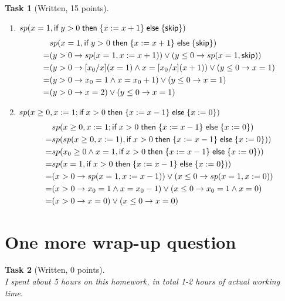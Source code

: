 \documentclass{article}
\newcommand{\stmt}[1]{\text{\sffamily #1}}
\newcommand{\ifs}[3]{\stmt{if}\;#1\;\stmt{then}\;\{#2\}\;\stmt{else}\;\{#3\}}
\newcommand{\skips}{\stmt{skip}}
\newcommand{\wrapup}[2]{I spent about #1 hours on this homework, in total #2 hours of actual working time.}
\theoremstyle{task}
\newtheorem{task}{Task}[section]
\begin{document}
\begin{task}[Written, 15 points]
\begin{enumerate}
\begin{align*}
                =& (x = y \rightarrow T) \wedge (x \neq y \rightarrow x/y = 1) \wedge
                (x \neq y \rightarrow y \neq 0)
            \end{align*}
        \item $sp(x = 1, \ifs{y > 0}{x := x + 1}{\skips})$
            \begin{align*}
                &sp(x = 1, \ifs{y > 0}{x := x + 1}{\skips}) \\
                =& (y > 0 \rightarrow sp(x = 1, x := x + 1)) \vee (y \leq 0 \rightarrow sp(x = 1, \skips)) \\
                =& (y > 0 \rightarrow [x_0/x](x = 1) \wedge x = [x_0/x](x + 1)) \vee (y \leq 0 \rightarrow x = 1) \\
                =& (y > 0 \rightarrow x_0 = 1 \wedge x = x_0 + 1) \vee (y \leq 0 \rightarrow x = 1) \\
                =& (y > 0 \rightarrow x = 2) \vee (y \leq 0 \rightarrow x = 1)
            \end{align*}
        \item $sp(x \geq 0, x := 1; \ifs{x > 0}{x := x - 1}{x := 0})$
            \begin{align*}
                &sp(x \geq 0, x := 1; \ifs{x > 0}{x := x - 1}{x := 0}) \\
                =& sp(sp(x \geq 0, x := 1), \ifs{x > 0}{x := x - 1}{x := 0})) \\
                =& sp(x_0 \geq 0 \wedge x = 1, \ifs{x > 0}{x := x - 1}{x := 0})) \\
                =& sp(x = 1, \ifs{x > 0}{x := x - 1}{x := 0})) \\
                =& (x > 0 \rightarrow sp(x = 1, x := x - 1)) \vee (x \leq 0 \rightarrow sp(x = 1, x := 0)) \\
                =& (x > 0 \rightarrow x_0 = 1 \wedge x = x_0 - 1) \vee (x \leq 0 \rightarrow x_0 = 1 \wedge x = 0) \\
                =& (x > 0 \rightarrow x = 0) \vee (x \leq 0 \rightarrow x = 0)
            \end{align*}
    \end{enumerate}
\end{task}

\section{One more wrap-up question}

\begin{task}[Written, 0 points]\ \\
    \wrapup{5}{1-2}
\end{task}
\end{document}
